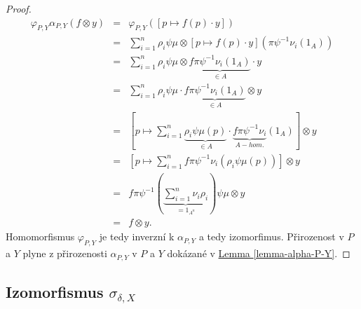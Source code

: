 \begin{proof}
         \begin{eqnarray}
           \varphi_{P,Y} \alpha_{P,Y} (f\otimes y) &=& \varphi_{P,Y}([p\mapsto f(p)\cdot y]) \nonumber \\
           &=& \sum_{i=1}^n \rho_i\psi\mu \otimes [p\mapsto f(p)\cdot y](\pi\psi^{-1}\nu_i(1_A)) \nonumber \\
           &=& \sum_{i=1}^n \rho_i\psi\mu \otimes \underbrace{f\pi\psi^{-1}\nu_i(1_A)}_{\in A} \cdot y  \nonumber \\
           &=& \sum_{i=1}^n \rho_i\psi\mu \cdot \underbrace{f\pi\psi^{-1}\nu_i(1_A)}_{\in A} \otimes y \nonumber \\
           &=& \left[  
             p \mapsto \sum_{i=1}^n 
               \underbrace{\rho_i\psi\mu(p)}_{\in A}
               \cdot 
               \underbrace{f\pi\psi^{-1}\nu_i}_{A-hom.}
               (1_A)
           \right] \otimes y \nonumber \\
           &=& \left[  
             p \mapsto \sum_{i=1}^n 
               f\pi\psi^{-1}\nu_i
               ( \rho_i\psi\mu(p) )
           \right] \otimes y \nonumber \\
           &=& 
             f\pi\psi^{-1} 
             \left( 
               \underbrace{\sum_{i=1}^n\nu_i\rho_i}_{=1_{A^n}}
             \right)
             \psi\mu \otimes y
             \nonumber \\
           &=& f\otimes y.  \nonumber
         \end{eqnarray}
        Homomorfismus $\varphi_{P,Y}$ je tedy inverzní k $\alpha_{P,Y}$ a tedy 
        izomorfimus. Přirozenost v $P$ a $Y$ plyne z přirozenosti $\alpha_{P,Y}$ v $P$ a $Y$ 
        dokázané v \hyperref[lemma-alpha-P-Y]{Lemma \ref*{lemma-alpha-P-Y}}. 
       \end{proof}


   \subsection{Izomorfismus $\sigma_{\delta,X}$}\label{alg-sigma}
   
